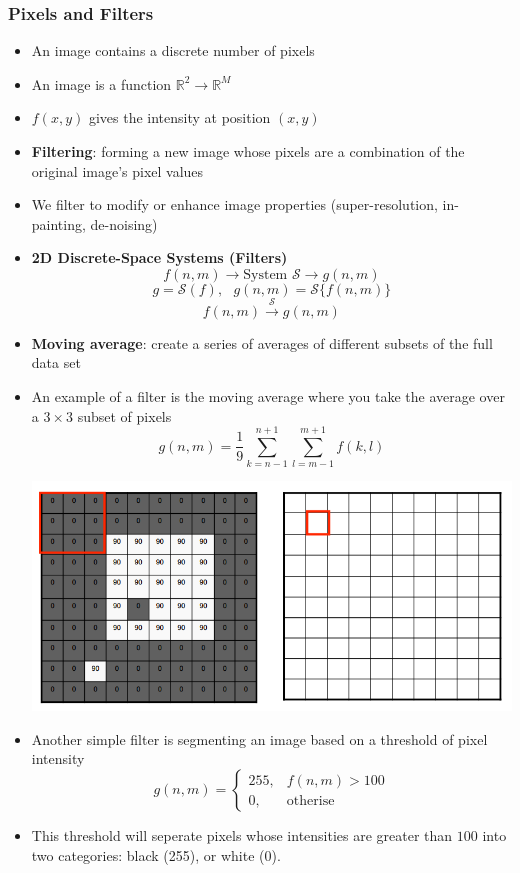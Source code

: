 \subsubsection{Pixels and Filters}
\begin{itemize}[--]
	\item An image contains a discrete number of pixels
	\item An image is a function $\mathbb{R}^2\to\mathbb{R}^M$
	\item $f(x,y)$ gives the intensity at position $(x,y)$


	\item \textbf{Filtering}: forming a new image whose pixels are a combination of the original image's pixel values
	\item We filter to modify or enhance image properties (super-resolution, in-painting, de-noising)
	\item \textbf{2D Discrete-Space Systems (Filters)}
		$$f(n,m)\to \text{System }\mathcal{S} \to g(n,m)$$ 
		$$g=\mathcal{S}(f),\text{ } g(n,m)=\mathcal{S}\{f(n,m)\}$$
		$$f(n,m)\xrightarrow{\mathcal{S}} g(n,m)$$
	\item \textbf{Moving average}: create a series of averages of different subsets of the full data set
	\item An example of a filter is the moving average where you take the average over a $3\times 3$ subset of pixels
		$$g(n,m)=\frac{1}{9}\sum_{k=n-1}^{n+1}\sum_{l=m-1}^{m+1} f(k,l)$$
	\begin{center}
		\includegraphics[scale=0.5]{sections/cs131/1-cameras/movingaverage_3x3.png}
	\end{center}

	\item Another simple filter is segmenting an image based on a threshold of pixel intensity
	$$g(n,m)=\begin{cases}
		255, &f(n,m)>100\\
		0, &\text{otherise}
	\end{cases}$$
	\item This threshold will seperate pixels whose intensities are greater than $100$ into two categories: black (255), or white (0).


\end{itemize}
